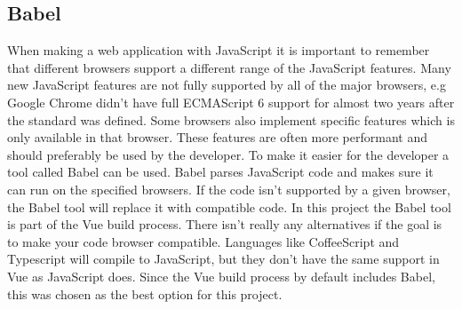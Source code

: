 \subsection{Babel}
When making a web application with JavaScript it is important to remember that different browsers support a different range of the JavaScript features. Many new JavaScript features are not fully supported by all of the major browsers, e.g Google Chrome didn't have full ECMAScript 6 support for almost two years after the standard was defined. Some browsers also implement specific features which is only available in that browser. These features are often more performant and should preferably be used by the developer. To make it easier for the developer a tool called Babel\cite{Babel:Info} can be used. Babel parses JavaScript code and makes sure it can run on the specified browsers. If the code isn't supported by a given browser, the Babel tool will replace it with compatible code. In this project the Babel tool is part of the Vue build process. There isn't really any alternatives if the goal is to make your code browser compatible. Languages like CoffeeScript and Typescript will compile to JavaScript, but they don't have the same support in Vue as JavaScript does. Since the Vue build process by default includes Babel, this was chosen as the best option for this project.